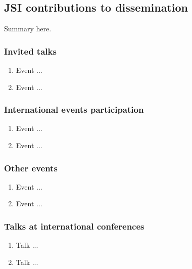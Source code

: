 \subsection{JSI contributions to dissemination}

Summary here.

\subsubsection{Invited talks}

\begin{enumerate}
\item  Event ...

\item  Event ...
\end{enumerate}

\subsubsection{International events participation}

\begin{enumerate}

\item  Event ...

\item  Event ...

\end{enumerate}

\subsubsection{Other events}

\begin{enumerate}

\item  Event ...

\item  Event ...

\end{enumerate}

\subsubsection{Talks at international conferences}

\begin{enumerate}
\item  Talk ...

\item  Talk ...
\end{enumerate}



